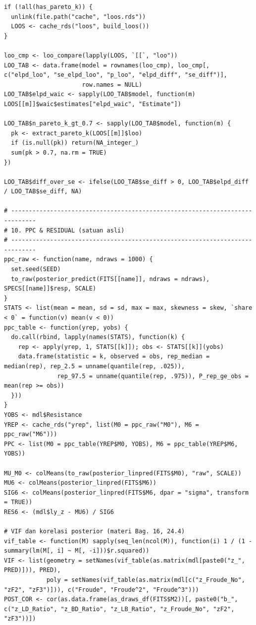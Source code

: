 \documentclass[
]{article}
\begin{document}
\begin{verbatim}
if (!all(has_pareto_k)) {
  unlink(file.path("cache", "loos.rds"))
  LOOS <- cache_rds("loos", build_loos())
}

loo_cmp <- loo_compare(lapply(LOOS, `[[`, "loo"))
LOO_TAB <- data.frame(model = rownames(loo_cmp), loo_cmp[, c("elpd_loo", "se_elpd_loo", "p_loo", "elpd_diff", "se_diff")],
                      row.names = NULL)
LOO_TAB$elpd_waic <- sapply(LOO_TAB$model, function(m) LOOS[[m]]$waic$estimates["elpd_waic", "Estimate"])

LOO_TAB$n_pareto_k_gt_0.7 <- sapply(LOO_TAB$model, function(m) {
  pk <- extract_pareto_k(LOOS[[m]]$loo)
  if (is.null(pk)) return(NA_integer_)
  sum(pk > 0.7, na.rm = TRUE)
})

LOO_TAB$diff_over_se <- ifelse(LOO_TAB$se_diff > 0, LOO_TAB$elpd_diff / LOO_TAB$se_diff, NA)

# -----------------------------------------------------------------------------
# 10. PPC & RESIDUAL (satuan asli)
# -----------------------------------------------------------------------------
ppc_raw <- function(name, ndraws = 1000) {
  set.seed(SEED)
  to_raw(posterior_predict(FITS[[name]], ndraws = ndraws), SPECS[[name]]$resp, SCALE)
}
STATS <- list(mean = mean, sd = sd, max = max, skewness = skew, `share < 0` = function(v) mean(v < 0))
ppc_table <- function(yrep, yobs) {
  do.call(rbind, lapply(names(STATS), function(k) {
    rep <- apply(yrep, 1, STATS[[k]]); obs <- STATS[[k]](yobs)
    data.frame(statistic = k, observed = obs, rep_median = median(rep), rep_2.5 = unname(quantile(rep, .025)),
               rep_97.5 = unname(quantile(rep, .975)), P_rep_ge_obs = mean(rep >= obs))
  }))
}
YOBS <- mdl$Resistance
YREP <- cache_rds("yrep", list(M0 = ppc_raw("M0"), M6 = ppc_raw("M6")))
PPC <- list(M0 = ppc_table(YREP$M0, YOBS), M6 = ppc_table(YREP$M6, YOBS))

MU_M0 <- colMeans(to_raw(posterior_linpred(FITS$M0), "raw", SCALE))
MU6 <- colMeans(posterior_linpred(FITS$M6))
SIG6 <- colMeans(posterior_linpred(FITS$M6, dpar = "sigma", transform = TRUE))
RES6 <- (mdl$ly_z - MU6) / SIG6

# VIF dan korelasi posterior (materi Bag. 16, 24.4)
vif_table <- function(M) sapply(seq_len(ncol(M)), function(i) 1 / (1 - summary(lm(M[, i] ~ M[, -i]))$r.squared))
VIF <- list(geometry = setNames(vif_table(as.matrix(mdl[paste0("z_", PRED)])), PRED),
            poly = setNames(vif_table(as.matrix(mdl[c("z_Froude_No", "zF2", "zF3")])), c("Froude", "Froude^2", "Froude^3")))
POST_COR <- cor(as.data.frame(as_draws_df(FITS$M2))[, paste0("b_", c("z_LD_Ratio", "z_BD_Ratio", "z_LB_Ratio", "z_Froude_No", "zF2", "zF3"))])


\end{verbatim}
\end{document}
